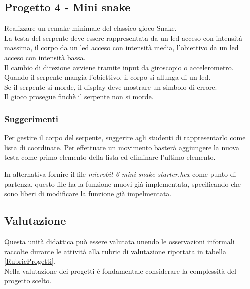 \documentclass[../../docenti.tex]{subfiles}
\begin{document}
\subsection{Progetto 4 - Mini snake}
Realizzare un remake minimale del classico gioco Snake.\\
La testa del serpente deve essere rappresentata da un led acceso con intensità massima, il corpo da un led acceso con intensità media, l'obiettivo da un led acceso con intensità bassa.\\
Il cambio di direzione avviene tramite input da giroscopio o accelerometro.\\
Quando il serpente mangia l'obiettivo, il corpo si allunga di un led.\\
Se il serpente si morde, il display deve mostrare un simbolo di errore.\\
Il gioco prosegue finchè il serpente non si morde.

\subsubsection{Suggerimenti}
Per gestire il corpo del serpente, suggerire agli studenti di rappresentarlo come lista di coordinate. Per effettuare un movimento basterà aggiungere la nuova testa come primo elemento della lista ed eliminare l'ultimo elemento.

In alternativa fornire il file \textit{microbit-6-mini-snake-starter.hex} come punto di partenza, questo file ha la funzione muovi già implementata, specificando che sono liberi di modificare la funzione già impelmentata.

\newpage
\subsection{Valutazione}
Questa unità didattica può essere valutata unendo le osservazioni informali raccolte durante le attività alla rubric di valutazione riportata in tabella \ref{RubricProgetti}.\\
Nella valutazione dei progetti è fondamentale considerare la complessità del progetto scelto.
\end{document}
